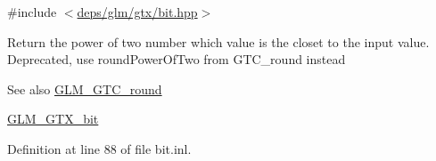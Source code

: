 {\ttfamily \#include $<$\hyperlink{bit_8hpp}{deps/glm/gtx/bit.\+hpp}$>$}

Return the power of two number which value is the closet to the input value. Deprecated, use round\+Power\+Of\+Two from G\+T\+C\+\_\+round instead

\begin{DoxySeeAlso}{See also}
\hyperlink{group__gtc__round}{G\+L\+M\+\_\+\+G\+T\+C\+\_\+round} 

\hyperlink{group__gtx__bit}{G\+L\+M\+\_\+\+G\+T\+X\+\_\+bit} 
\end{DoxySeeAlso}


Definition at line 88 of file bit.\+inl.

